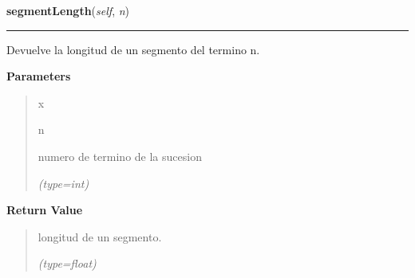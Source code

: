 \hspace{.8\funcindent}\begin{boxedminipage}{\funcwidth}

    \raggedright \textbf{segmentLength}(\textit{self}, \textit{n})

    \vspace{-1.5ex}

    \rule{\textwidth}{0.5\fboxrule}
\setlength{\parskip}{2ex}
    Devuelve la longitud de un segmento del termino n.

\setlength{\parskip}{1ex}
      \textbf{Parameters}
      \vspace{-1ex}

      \begin{quote}
        \begin{Ventry}{x}

          \item[n]

          numero de termino de la sucesion

            {\it (type=int)}

        \end{Ventry}

      \end{quote}

      \textbf{Return Value}
    \vspace{-1ex}

      \begin{quote}
      longitud de un segmento.

      {\it (type=float)}

      \end{quote}

    \end{boxedminipage}

    \label{FractalZE:koch:Koch:totalArea}

    \vspace{0.5ex}

